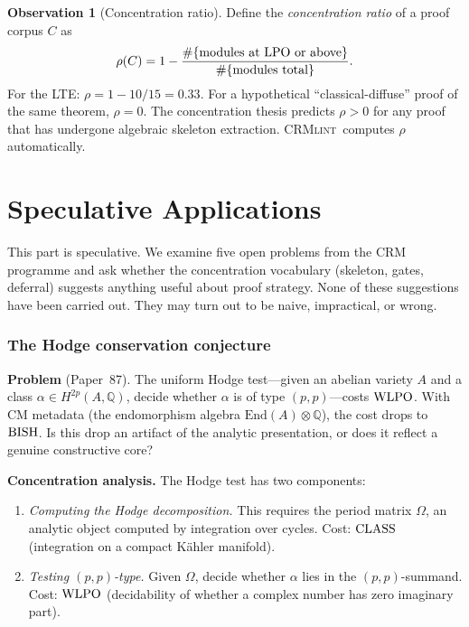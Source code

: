 \documentclass[11pt,a4paper]{article}
\theoremstyle{plain}
\theoremstyle{definition}
\newtheorem{observation}[theorem]{Observation}
\newcommand{\BISH}{\textup{BISH}}
\newcommand{\WLPO}{\textup{WLPO}}
\newcommand{\LPO}{\textup{LPO}}
\newcommand{\CLASS}{\textup{CLASS}}
\newcommand{\CRMlint}{\textsc{CRMlint}}
\newcommand{\Q}{\mathbb{Q}}
\begin{document}
\begin{observation}[Concentration ratio]
Define the \emph{concentration ratio} of a proof corpus $C$ as
\[
  \rho(C) = 1 - \frac{\#\{\text{modules at } \LPO \text{ or above}\}}
                      {\#\{\text{modules total}\}}.
\]
For the LTE: $\rho = 1 - 10/15 = 0.33$.  For a hypothetical
``classical-diffuse'' proof of the same theorem, $\rho = 0$.
The concentration thesis predicts $\rho > 0$ for any proof that
has undergone algebraic skeleton extraction.  \CRMlint\ computes
$\rho$ automatically.
\end{observation}


\part{Speculative Applications}\label{part:strategy}

This part is speculative.  We examine five open problems from the
CRM programme and ask whether the concentration vocabulary
(skeleton, gates, deferral) suggests anything useful about proof
strategy.  None of these suggestions have been carried out.
They may turn out to be naive, impractical, or wrong.

\section{The Hodge conservation conjecture}\label{sec:hodge-conservation}

\noindent\textbf{Problem} (Paper~87).
The uniform Hodge test---given an abelian variety $A$ and a class
$\alpha \in H^{2p}(A, \Q)$, decide whether $\alpha$ is of type
$(p,p)$---costs $\WLPO$.  With CM metadata (the endomorphism algebra
$\mathrm{End}(A) \otimes \Q$), the cost drops to $\BISH$.  Is this
drop an artifact of the analytic presentation, or does it reflect a
genuine constructive core?

\medskip
\noindent\textbf{Concentration analysis.}
The Hodge test has two components:
\begin{enumerate}[nosep,label=(\roman*)]
\item \emph{Computing the Hodge decomposition.}  This requires the
  period matrix $\Omega$, an analytic object computed by integration
  over cycles.  Cost: $\CLASS$ (integration on a compact K\"ahler
  manifold).
\item \emph{Testing $(p,p)$-type.}  Given $\Omega$, decide whether
  $\alpha$ lies in the $(p,p)$-summand.  Cost: $\WLPO$ (decidability
  of whether a complex number has zero imaginary part).
\end{enumerate}
\end{document}
